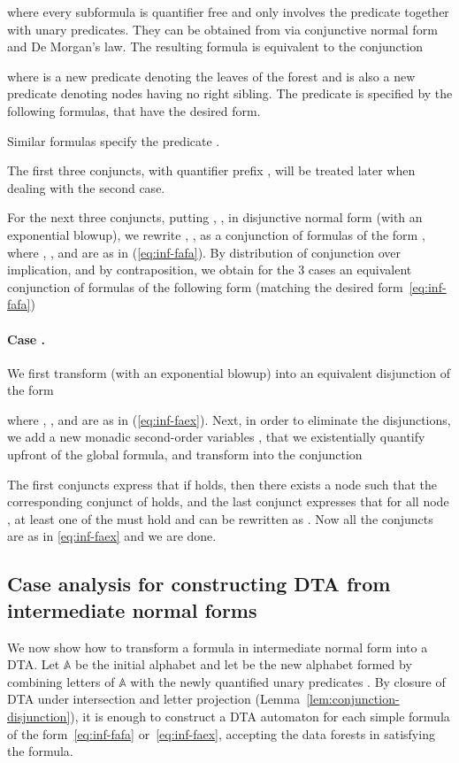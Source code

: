 \documentclass{CSML}
\newcommand\dad{\textup{DTA}\xspace}
\newcommand\A{\ensuremath{\mathbb{A}}\xspace}
\begin{document}
where every subformula  is quantifier free and only involves the predicate
 together with unary predicates. 
They can be obtained from  via conjunctive normal form and De Morgan's law.
The resulting formula is equivalent to the conjunction

where  is a new predicate denoting the leaves of the forest and
 is also a new predicate denoting nodes having no right sibling.  The
predicate  is specified by the following formulas, that have the desired form. 

Similar formulas specify the predicate .

\noindent
The first three conjuncts, with quantifier prefix , will be
treated later when dealing with the second case.

\noindent
For the next three conjuncts, putting , , 
 in disjunctive normal form 
(with an exponential blowup), 
we rewrite , ,
 as a conjunction of formulas of the form , 
where 
, , and  are as in (\ref{eq:inf-fafa}).
By distribution of conjunction over implication, and by contraposition, 
we obtain for the 3 cases an equivalent conjunction of formulas of the
following form (matching the desired form~\eqref{eq:inf-fafa}) 



\paragraph{\bf Case .}
We first transform  (with an exponential blowup) 
into an equivalent disjunction of the form

where , ,  and 
are as in (\ref{eq:inf-faex}).
Next, in order to eliminate the disjunctions, we add a new
monadic second-order variables , that we existentially quantify
upfront of the global formula, and transform  into the conjunction

The first conjuncts express that 
if  holds, then there exists a node  
such that the corresponding conjunct of  holds, 
and the last conjunct expresses that 
for all node , at least one of the  must hold and can be
rewritten as . Now all the conjuncts are as in \eqref{eq:inf-faex} and
we are done.













\subsection{Case analysis for constructing \texorpdfstring{\dad}{DTA} from intermediate normal forms} We now show how to transform a formula in intermediate normal form into a \dad. 
Let \A be the initial alphabet and let  be the new alphabet formed
by combining letters of \A with the newly quantified unary predicates .  
By closure of \dad under intersection and letter projection (Lemma~\ref{lem:conjunction-disjunction}), 
it is enough to construct a \dad automaton for each simple formula of the form~\eqref{eq:inf-fafa}
or~\eqref{eq:inf-faex}, accepting the data forests in  satisfying the formula.
\end{document}
